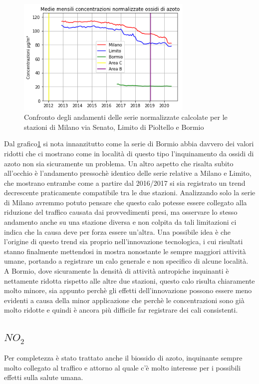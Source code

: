 \documentclass[a4paper]{report}
\begin{document}
\begin{figure}[h]
\centering
\includegraphics[width=0.75\textwidth]{nox_traffico}
\caption{Confronto degli andamenti delle serie normalizzate calcolate per le stazioni di Milano via Senato, Limito di Pioltello e Bormio}
\label{fig:nox_traffico}
\end{figure}

Dal grafico\ref{fig:nox_traffico} si nota innanzitutto come la serie di Bormio abbia davvero dei valori ridotti che ci mostrano come in località di questo tipo l'inquinamento da ossidi di azoto non sia sicuramente un problema.
Un altro aspetto che risalta subito all'occhio è l'andamento pressochè identico delle serie relative a Milano e Limito, che mostrano entrambe come a partire dal 2016/2017 si sia registrato un trend decrescente praticamente compatibile tra le due stazioni. Analizzando solo la serie di Milano avremmo potuto pensare che questo calo potesse essere collegato alla riduzione del traffico causata dai provvedimenti presi, ma osservare lo stesso andamento anche su una stazione diversa e non colpita da tali limitazioni ci indica che la causa deve per forza essere un'altra. Una possibile idea è che l'origine di questo trend sia proprio nell'innovazione tecnologica, i cui risultati stanno finalmente mettendosi in mostra nonostante le sempre maggiori attività umane, portando a registrare un calo generale e non specifico di alcune località. A Bormio, dove sicuramente la densità di attività antropiche inquinanti è nettamente ridotta rispetto alle altre due stazioni, questo calo risulta chiaramente molto minore, sia appunto perchè gli effetti dell'innovazione possono essere meno evidenti a causa della minor applicazione che perchè le concentrazioni sono già molto ridotte e quindi è ancora più difficile far registrare dei cali consistenti.

\subsection{$NO_2$}
Per completezza è stato trattato anche il biossido di azoto, inquinante sempre molto collegato al traffico e attorno al quale c'è molto interesse per i possibili effetti sulla salute umana.
\end{document}
